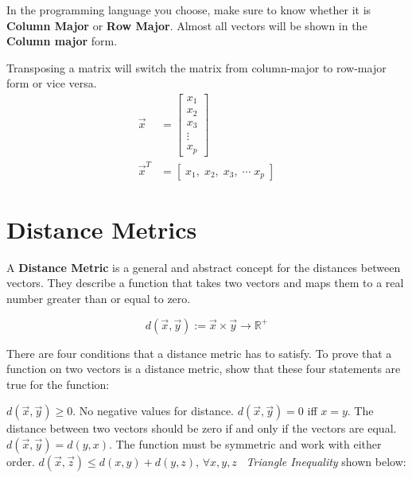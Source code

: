 In the programming language you choose, make sure to know whether it is \textbf{Column Major} or \textbf{Row Major}. Almost all vectors will be shown in the \textbf{Column major} form.


Transposing a matrix will switch the matrix from column-major to row-major form or vice versa.
  \begin{align*}
    \vec{x} &= \begin{bmatrix}
           x_{1} \\
           x_{2} \\
           x_{3} \\
           \vdots \\
           x_{p}
         \end{bmatrix} \\
    \vec{x}^T &= [\; x_1, \; x_2, \; x_3, \; \cdots \; x_p \;]
  \end{align*}



\section{Distance Metrics}
A \textbf{Distance Metric} is a general and abstract concept for the distances between vectors. They describe a function that takes two vectors and maps them to a real number greater than or equal to zero. 

\[
    d(\vec{x},\vec{y}):= \vec{x} \times \vec{y} \rightarrow \mathbb{R}^+
\]

There are four conditions that a distance metric has to satisfy. To prove that a function on two vectors is a distance metric, show that these four statements are true for the function:

\begin{outline}
    \1 $d(\vec{x}, \vec{y}) \ge 0$. \; No negative values for distance.
    \1 $d(\vec{x}, \vec{y}) = 0$ iff $x = y$. \; The distance between two vectors should be zero if and only if the vectors are equal.
    \1 $d(\vec{x}, \vec{y}) = d(y,x)$. \; The function must be symmetric and work with either order.
    \1 $d(\vec{x}, \vec{z}) \le d(x,y) + d(y,z)$, $\forall x, y, z$ \  \textit{Triangle Inequality} shown below:
\end{outline}

\begin{center}
\end{center}

